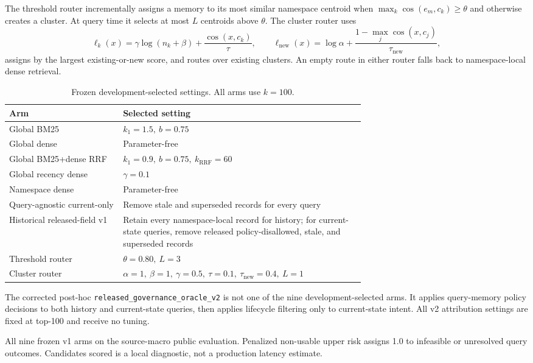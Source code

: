 \documentclass{article}
\begin{document}
The threshold router incrementally assigns a memory to its most similar namespace
centroid when $\max_k\cos(e_m,c_k)\geq\theta$ and otherwise creates a cluster.  At
query time it selects at most $L$ centroids above $\theta$.  The cluster router uses
\[
\ell_k(x)=\gamma\log(n_k+\beta)+\frac{\cos(x,c_k)}{\tau},
\qquad
\ell_{\mathrm{new}}(x)=\log\alpha+
\frac{1-\max_j\cos(x,c_j)}{\tau_{\mathrm{new}}},
\]
assigns by the largest existing-or-new score, and routes over existing clusters.
An empty route in either router falls back to namespace-local dense retrieval.

\begin{table}[ht]
  \centering
  \small
  \caption{Frozen development-selected settings.  All arms use $k=100$.}
  \label{tab:selected-settings}
  \begin{tabular}{lp{0.68\linewidth}}
    \toprule
    Arm & Selected setting \\
    \midrule
    Global BM25 & $k_1=1.5,\ b=0.75$ \\
    Global dense & Parameter-free \\
    Global BM25+dense RRF & $k_1=0.9,\ b=0.75,\ k_{\mathrm{RRF}}=60$ \\
    Global recency dense & $\gamma=0.1$ \\
    Namespace dense & Parameter-free \\
    Query-agnostic current-only & Remove stale and superseded records for every query \\
    Historical released-field v1 & Retain every namespace-local record for history;
      for current-state queries, remove released policy-disallowed, stale, and
      superseded records \\
    Threshold router & $\theta=0.80,\ L=3$ \\
    Cluster router & $\alpha=1,\ \beta=1,\ \gamma=0.5,\ \tau=0.1,\
      \tau_{\mathrm{new}}=0.4,\ L=1$ \\
    \bottomrule
  \end{tabular}
\end{table}

The corrected post-hoc \texttt{released\_governance\_oracle\_v2} is not one of the
nine development-selected arms.  It applies query-memory policy decisions to both
history and current-state queries, then applies lifecycle filtering only to
current-state intent.  All v2 attribution settings are fixed at top-100 and receive
no tuning.

\begin{table}[ht]
  \centering
  \small
  \caption{All nine frozen v1 arms on the source-macro public evaluation.  Penalized
  non-usable upper risk assigns 1.0 to infeasible or unresolved query outcomes.
  Candidates scored is a local diagnostic, not a production latency estimate.}
  \label{tab:all-arms}
  
\end{table}
\end{document}
